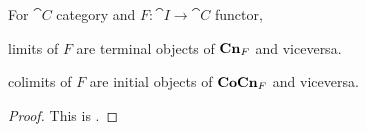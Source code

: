 \begin{proposition}
For \(\cat C\)  category and \(F : \cat I \to \cat C\) functor,
\begin{tcbitem}
\item limits of \(F\) are terminal objects of \(\mathbf{Cn}_F\) and viceversa.
\item colimits of \(F\) are initial objects of \(\mathbf{CoCn}_F\) and viceversa.
\end{tcbitem}
\end{proposition}

\begin{proof}
This is .
\end{proof}
